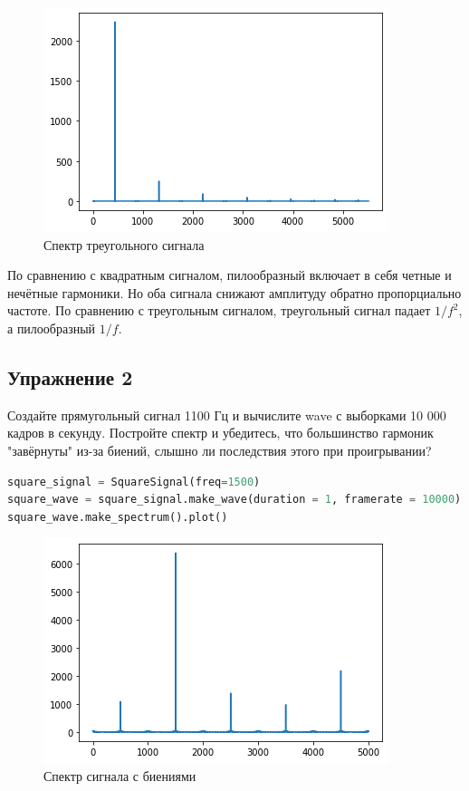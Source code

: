 \begin{figure}[H]
	\begin{center}
		\includegraphics[scale=1]{fig/lab02/lab02_13_0.png}
		\caption{Спектр треугольного сигнала}
	\end{center}
\end{figure}

По сравнению с квадратным сигналом, пилообразный включает в себя четные и нечётные гармоники. Но оба сигнала снижают амплитуду обратно пропорциально частоте.
По сравнению с треугольным сигналом, треугольный сигнал падает $1/f^2$, а пилообразный $1/f$.

\subsection{Упражнение 2}

Создайте прямугольный сигнал 1100 Гц и вычислите wave с выборками 10 000 кадров в секунду. Постройте спектр и убедитесь, что большинство гармоник "завёрнуты" из-за биений, слышно ли последствия этого при проигрывании?

\begin{lstlisting}[language=Python]
square_signal = SquareSignal(freq=1500)
square_wave = square_signal.make_wave(duration = 1, framerate = 10000)
square_wave.make_spectrum().plot()
\end{lstlisting}

\begin{figure}[H]
	\begin{center}
		\includegraphics[scale=1]{fig/lab02/lab02_16_0.png}
		\caption{Спектр сигнала с биениями}
	\end{center}
\end{figure}

